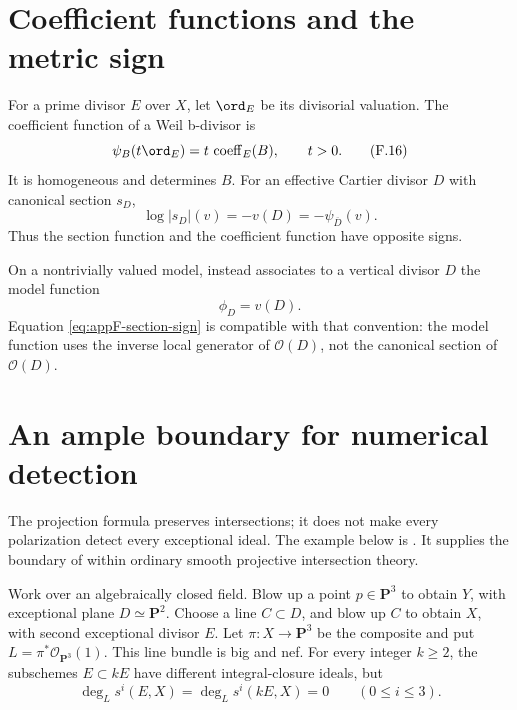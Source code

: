\section{Coefficient functions and the metric sign}
\label{sec:appF-coefficient-functions}

For a prime divisor \(E\) over \(X\), let \(\ord_E\) be its divisorial
valuation.
The coefficient function of a Weil b-divisor is
\[
                 \psi_B(t\ord_E)=t\,\operatorname{coeff}_E(B),
                 \qquad t>0.
\tag{F.16}\label{eq:appF-coefficient-function}
\]
It is homogeneous and determines \(B\).
For an effective Cartier divisor \(D\) with canonical section \(s_D\),
\[
                         \log|s_D|(v)=-v(D)=-\psi_{\overline D}(v).
\tag{F.17}\label{eq:appF-section-sign}
\]
Thus the section function and the coefficient function have opposite signs.

On a nontrivially valued model,  instead
associates to a vertical divisor \(D\) the model function
\[
                              \phi_D=v(D).
\]
Equation \eqref{eq:appF-section-sign} is compatible with that convention:
the model function uses the inverse local generator of
\(\mathcal O(D)\), not the canonical section of \(\mathcal O(D)\).

\section{An ample boundary for numerical detection}
\label{sec:appF-Segre-ample-boundary}

The projection formula preserves intersections; it does not make
every polarization detect every exceptional ideal. The example
below is \cite[Example~4.7]{CidRuiz26SegrePublished}. It supplies
the boundary of  within
ordinary smooth projective intersection theory.

\begin{example}
\label{ex:appF-big-nef-Segre}
Work over an algebraically closed field. Blow up a point
$p\in\mathbf P^3$ to obtain $Y$, with exceptional plane
$D\simeq\mathbf P^2$. Choose a line $C\subset D$, and blow up
$C$ to obtain $X$, with second exceptional divisor $E$.
Let $\pi:X\longrightarrow\mathbf P^3$ be the composite and put
$L=\pi^*\mathcal O_{\mathbf P^3}(1)$. This line bundle is big
and nef. For every integer $k\geq2$, the subschemes $E\subset kE$
have different integral-closure ideals, but
\[
 \deg_L s^i(E,X)=\deg_L s^i(kE,X)=0
 \qquad(0\leq i\leq3).
\tag{F.18}\label{eq:appF-big-nef-Segre-zero}
\]
\end{example}

